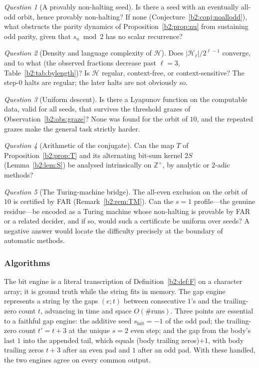 \documentclass[a4paper]{article}
\theoremstyle{plain}
\theoremstyle{definition}
\theoremstyle{remark}
\newtheorem{question}{Question}[subsection]
\begin{document}
\begin{question}[A provably non-halting seed]\label{b2:q:provable}
Is there a seed with an eventually all-odd orbit, hence provably non-halting? If none (Conjecture~\ref{b2:conj:noallodd}), what obstructs the parity dynamics of Proposition~\ref{b2:prop:nu} from sustaining odd parity, given that $s_n\bmod 2$ has no scalar recurrence?
\end{question}

\begin{question}[Density and language complexity of $\mathcal H$]\label{b2:q:density}
Does $|\mathcal H_\ell|/2^{\ell-1}$ converge, and to what (the observed fractions decrease past $\ell=3$, Table~\ref{b2:tab:bylength})? Is $\mathcal H$ regular, context-free, or context-sensitive? The step-$0$ halts are regular; the later halts are not obviously so.
\end{question}

\begin{question}[Uniform descent]\label{b2:q:descent}
Is there a Lyapunov function on the computable data, valid for all seeds, that survives the threshold grazes of Observation~\ref{b2:obs:graze}? None was found for the orbit of $10$, and the repeated grazes make the general task strictly harder.
\end{question}

\begin{question}[Arithmetic of the conjugate]\label{b2:q:arith}
Can the map $T$ of Proposition~\ref{b2:prop:T} and its alternating bit-sum kernel $2S$ (Lemma~\ref{b2:lem:S}) be analysed intrinsically on $\mathbb Z^+$, by analytic or $2$-adic methods?
\end{question}

\begin{question}[The Turing-machine bridge]\label{b2:q:TM}
The all-even exclusion on the orbit of $10$ is certified by FAR (Remark~\ref{b2:rem:TM}). Can the $s=1$ profile---the genuine residue---be encoded as a Turing machine whose non-halting is provable by FAR or a related decider, and if so, would such a certificate be uniform over seeds? A negative answer would locate the difficulty precisely at the boundary of automatic methods.
\end{question}

\subsubsection{Algorithms}\label{b2:app:alg}
The bit engine is a literal transcription of Definition~\ref{b2:def:F} on a character array; it is ground truth while the string fits in memory. The gap engine represents a string by the gaps $(e;t)$ between consecutive $1$'s and the trailing-zero count $t$, advancing in time and space $O(\#\text{runs})$. Three points are essential to a faithful gap engine: the additive seed $s_{\mathrm{init}}=-1$ of the odd pad; the trailing-zero count $t'=t+3$ at the unique $s=2$ even step; and the gap from the body's last $1$ into the appended tail, which equals (body trailing zeros)$+1$, with body trailing zeros $t+3$ after an even pad and $1$ after an odd pad. With these handled, the two engines agree on every common output.
\end{document}
